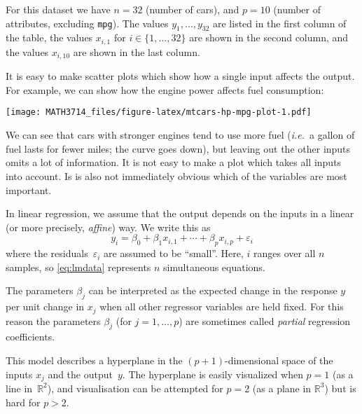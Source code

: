 \documentclass[
  a4paper,
]{article}
\newenvironment{Shaded}{\begin{snugshade}}{\end{snugshade}}
\newcommand{\AttributeTok}[1]{\textcolor[rgb]{0.77,0.63,0.00}{#1}}
\newcommand{\FunctionTok}[1]{\textcolor[rgb]{0.00,0.00,0.00}{#1}}
\newcommand{\NormalTok}[1]{#1}
\newcommand{\SpecialCharTok}[1]{\textcolor[rgb]{0.00,0.00,0.00}{#1}}
\newcommand{\StringTok}[1]{\textcolor[rgb]{0.31,0.60,0.02}{#1}}
\theoremstyle{definition}
\theoremstyle{definition}
\theoremstyle{definition}
\theoremstyle{definition}
\theoremstyle{remark}
\begin{document}
For this dataset we have \(n = 32\) (number of cars), and \(p = 10\) (number
of attributes, excluding \texttt{mpg}). The values \(y_1, \ldots, y_{32}\) are listed
in the first column of the table, the values \(x_{i,1}\) for \(i \in \{1, \ldots, 32\}\) are shown in the second column, and the values \(x_{i,10}\) are shown in
the last column.

It is easy to make scatter plots which show how a single
input affects the output. For example, we can show how the engine power
affects fuel consumption:

\begin{Shaded}
\end{Shaded}

\texttt{[image: MATH3714\_files/figure-latex/mtcars-hp-mpg-plot-1.pdf]}

We can see that cars with stronger engines tend to use more fuel
(\emph{i.e.}~a gallon of fuel lasts for fewer miles; the curve goes down),
but leaving out the other inputs omits a lot of information. It is
not easy to make a plot which takes all inputs into account. Is is
also not immediately obvious which of the variables are most
important.

In linear regression, we assume that the output depends on the
inputs in a linear (or more precisely, \emph{affine}) way. We write
this as
\begin{equation}
  y_i
  = \beta_0 + \beta_1 x_{i,1} + \cdots + \beta_p x_{i,p} + \varepsilon_i \label{eq:lmdata}
\end{equation}
where the residuals~\(\varepsilon_i\) are assumed to be ``small''. Here, \(i\)
ranges over all \(n\) samples, so \eqref{eq:lmdata} represents \(n\)
simultaneous equations.

The parameters \(\beta_j\) can be interpreted as the expected change in
the response \(y\) per unit change in \(x_j\) when all other regressor
variables are held fixed. For this reason the parameters \(\beta_j\)
(for \(j=1, \ldots, p\)) are sometimes called \emph{partial} regression
coefficients.

This model describes a hyperplane in the \((p+1)\)-dimensional space of
the inputs \(x_j\) and the output~\(y\). The hyperplane is easily
visualized when \(p=1\) (as a line in~\(\mathbb{R}^2\)), and visualisation can be
attempted for \(p=2\) (as a plane in \(\mathbb{R}^3\)) but is hard for \(p>2\).
\end{document}
